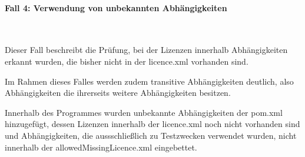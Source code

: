 \paragraph{Fall 4: Verwendung von unbekannten Abhängigkeiten} $~$

Dieser Fall beschreibt die Prüfung, bei der Lizenzen innerhalb Abhängigkeiten erkannt wurden, die bisher nicht in der licence.xml vorhanden sind.

Im Rahmen dieses Falles werden zudem transitive Abhängigkeiten deutlich, also Abhängigkeiten die ihrerseits weitere Abhängigkeiten besitzen. 

Innerhalb des Programmes wurden unbekannte Abhängigkeiten der pom.xml hinzugefügt, dessen Lizenzen innerhalb der licence.xml noch nicht vorhanden sind und Abhängigkeiten, die aussschließlich zu Testzwecken verwendet wurden, nicht innerhalb der allowedMissingLicence.xml eingebettet. 

